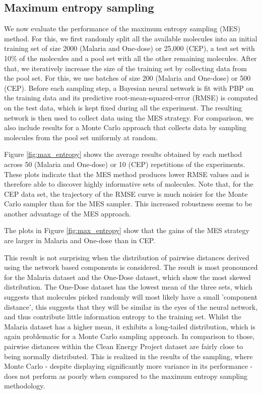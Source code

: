 \subsection{Maximum entropy sampling}

We now evaluate the performance of the maximum entropy sampling (MES) method. For this, we first randomly split all the available molecules into an initial training set of size 2000 (Malaria and One-dose) or 25,000 (CEP), a test set with 10\% of the molecules and a pool set with all the other remaining molecules. After that, we iteratively increase the size of the training set by collecting data from the pool set. For this, we use batches of size 200 (Malaria and One-dose) or 500 (CEP). Before each sampling step, a Bayesian neural network is fit with PBP on the training data and its predictive root-mean-squared-error (RMSE) is computed on the test data, which is kept fixed during all the experiment. The resulting network is then used to collect data using the MES strategy. For comparison, we also include results for a Monte Carlo approach that collects data by sampling molecules from the pool set uniformly at random.

Figure \ref{fig:max_entropy} shows the average results obtained by each method across 50 (Malaria and One-dose) or 10 (CEP) repetitions of the experiments. These plots indicate that the MES method produces lower RMSE values and is therefore able to discover highly informative sets of molecules. Note that, for the CEP data set, the trajectory of the RMSE curve is much noisier for the Monte Carlo sampler than for the MES sampler. This increased robustness seems to be another advantage of the MES approach.


The plots in Figure \ref{fig:max_entropy} show that the gains of the MES strategy are larger in Malaria and One-dose than in CEP. 

This result is not surprising when the distribution of pairwise distances derived using the network based components is considered. The result is most pronounced for the Malaria dataset and the One-Dose dataset, which show the most skewed distribution.  The One-Dose dataset has the lowest mean of the three sets, which suggests that molecules picked randomly will most likely have a small 'component distance', this suggests that they will be similar in the eyes of the neural network, and thus contribute little information entropy to the training set. Whilst the Malaria dataset has a higher mean, it exhibits a long-tailed distribution, which is again problematic for a Monte Carlo sampling approach.  In comparison to those, pairwise distances within the Clean Energy Project dataset are fairly close to being normally distributed.  This is realized in the results of the sampling, where Monte Carlo - despite displaying significantly more variance in its performance - does not perform as poorly when compared to the maximum entropy sampling methodology.

